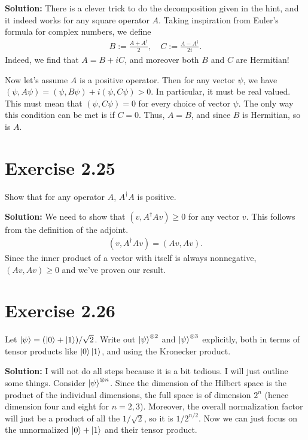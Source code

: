 \documentclass{book}
\begin{document}
    \textbf{Solution:} There is a clever trick to do the decomposition given in the hint, and it indeed works for any square operator $A$. Taking inspiration from Euler's formula for complex numbers, we define
    \begin{align}
        B := \frac{A + A^\dagger}{2}, \quad C := \frac{A - A^\dagger }{2i}.
    \end{align}
    Indeed, we find that $A = B + i C$, and moreover both $B$ and $C$ are Hermitian! 
    
    Now let's assume $A$ is a positive operator. Then for any vector $\psi$, we have $(\psi, A \psi) = (\psi, B\psi) + i (\psi, C\psi) > 0$. In particular, it must be real valued. This must mean that $(\psi, C\psi) = 0$ for every choice of vector $\psi$. The only way this condition can be met is if $C= 0$. Thus, $A = B$, and since $B$ is Hermitian, so is $A$.
    
\section*{Exercise 2.25}
    Show that for any operator $A$, $A^\dagger A$ is positive.
    
    \textbf{Solution:} We need to show that $(v, A^\dagger A v) \geq 0$ for any vector $v$. This follows from the definition of the adjoint.
    \begin{align}
        (v, A^\dagger A v) = (A v, A v).
    \end{align}
    Since the inner product of a vector with itself is always nonnegative, $(A v, A v) \geq 0$ and we've proven our result.
    
\section*{Exercise 2.26}
    Let $\ket{\psi} = (\ket{0}+\ket{1})/\sqrt{2}$. Write out $\ket{\psi}^{\otimes 2}$ and $\ket{\psi}^{\otimes{3}}$ explicitly, both in terms of tensor products like $\ket{0}\ket{1}$, and using the Kronecker product.
    
    \textbf{Solution:} I will not do all steps because it is a bit tedious. I will just outline some things. Consider $\ket{\psi}^{\otimes n}$. Since the dimension of the Hilbert space is the product of the individual dimensions, the full space is of dimension $2^{n}$ (hence dimension four and eight for $n = 2, 3$). Moreover, the overall normalization factor will just be a product of all the $1/\sqrt{2}$, so it is $1/2^{n/2}$. Now we can just focus on the unnormalized $\ket{0} + \ket{1}$ and their tensor product. 
    
\end{document}

